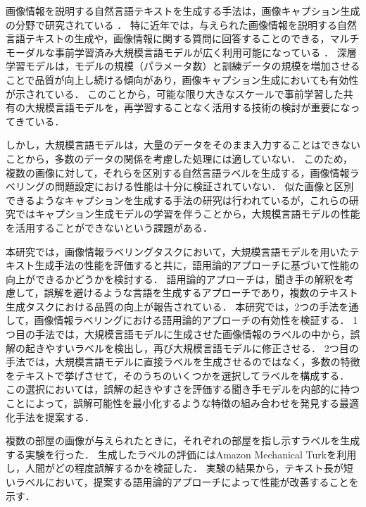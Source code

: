 \documentclass[a4paper,11pt]{jreport}
\begin{document}
画像情報を説明する自然言語テキストを生成する手法は，画像キャプション生成の分野で研究されている \cite{Farhadi2010,Vinyals2017,Dai2023}．
特に近年では，与えられた画像情報を説明する自然言語テキストの生成や，画像情報に関する質問に回答することのできる，マルチモーダルな事前学習済み大規模言語モデルが広く利用可能になっている \cite{Gan2022}．
深層学習モデルは，モデルの規模（パラメータ数）と訓練データの規模を増加させることで品質が向上し続ける傾向があり\cite{Devlin2019}，画像キャプション生成においても有効性が示されている．
このことから，可能な限り大きなスケールで事前学習した共有の大規模言語モデルを，再学習することなく活用する技術の検討が重要になってきている．

しかし，大規模言語モデルは，大量のデータをそのまま入力することはできないことから，多数のデータの関係を考慮した処理には適していない．
このため，複数の画像に対して，それらを区別する自然言語ラベルを生成する，画像情報ラベリングの問題設定における性能は十分に検証されていない．
似た画像と区別できるようなキャプションを生成する手法の研究は行われている\cite{Vedantam2017,Cohn-Gordon2018,Nie2020,Andreas2016}が，これらの研究ではキャプション生成モデルの学習を伴うことから，大規模言語モデルの性能を活用することができないという課題がある．

本研究では，画像情報ラベリングタスクにおいて，大規模言語モデルを用いたテキスト生成手法の性能を評価すると共に，語用論的アプローチに基づいて性能の向上ができるかどうかを検討する．
語用論的アプローチは，聞き手の解釈を考慮して，誤解を避けるような言語を生成するアプローチであり，複数のテキスト生成タスクにおける品質の向上が報告されている．
本研究では，2つの手法を通して，画像情報ラベリングにおける語用論的アプローチの有効性を検証する．
1つ目の手法では，大規模言語モデルに生成させた画像情報のラベルの中から，誤解の起きやすいラベルを検出し，再び大規模言語モデルに修正させる．
2つ目の手法では，大規模言語モデルに直接ラベルを生成させるのではなく，多数の特徴をテキストで挙げさせて，そのうちのいくつかを選択してラベルを構成する．
この選択においては，誤解の起きやすさを評価する聞き手モデルを内部的に持つことによって，誤解可能性を最小化するような特徴の組み合わせを発見する最適化手法を提案する．

複数の部屋の画像が与えられたときに，それぞれの部屋を指し示すラベルを生成する実験を行った．
生成したラベルの評価にはAmazon Mechanical Turkを利用し，人間がどの程度誤解するかを検証した．
実験の結果から，テキスト長が短いラベルにおいて，提案する語用論的アプローチによって性能が改善することを示す．

\end{document}
